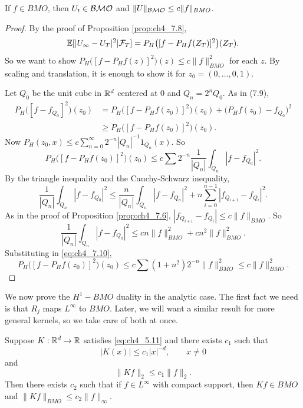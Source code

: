\begin{proposition}\label{prop:ch4_7.9}
If $f \in BMO$, then $U_t \in \mathcal{BMO}$ and $\|U\|_{\mathcal{BMO}} \leq c\|f\|_{BMO}$.
\end{proposition}

\begin{proof}
By the proof of Proposition \ref{prop:ch4_7.8},
\[
    \mathbb{E}[|U_\infty - U_T|^2| \mathcal{F}_T] = P_H\big([f - P_Hf(Z_T)]^2\big)(Z_T).
\]
So we want to show $P_H\big([f - P_Hf(z)]^2\big)(z) \leq c\|f\|^2_{BMO}$ for each $z$. By scaling and translation, it is enough to show it for $z_0 = (0,\ldots,0,1)$.

Let $Q_0$ be the unit cube in $\mathbb{R}^d$ centered at $0$ and $Q_n = 2^nQ_0$. As in (7.9),
\begin{align*}
    P_H\big([f - f_{Q_0}]^2\big)(z_0) &= P_H\big([f - P_Hf(z_0)]^2\big)(z_0) + \big(P_Hf(z_0) - f_{Q_0}\big)^2 \\
    &\geq P_H\big([f - P_Hf(z_0)]^2\big)(z_0).
\end{align*}
Now $P_H(z_0,x) \leq c\sum_{n=0}^\infty 2^{-n}|Q_n|^{-1}1_{Q_n}(x)$. So
\mpagebreak
\begin{equation}\label{eq:ch4_7.10}
    P_H\big([f - P_Hf(z_0)]^2\big)(z_0) \leq c\sum 2^{-n}\frac{1}{|Q_n|}\int_{Q_n} |f - f_{Q_0}|^2.
\end{equation}
By the triangle inequality and the Cauchy-Schwarz inequality,
\[
    \frac{1}{|Q_n|}\int_{Q_n} |f - f_{Q_0}|^2 \leq \frac{n}{|Q_n|}\int_{Q_n} |f - f_{Q_n}|^2 + n\sum_{i=0}^{n-1}|f_{Q_{i+1}} - f_{Q_i}|^2.
\]
As in the proof of Proposition \ref{prop:ch4_7.6}, $|f_{Q_{i+1}} - f_{Q_i}| \leq c\|f\|_{BMO}$. So
\[
    \frac{1}{|Q_n|}\int_{Q_n} |f - f_{Q_0}|^2 \leq cn\|f\|^2_{BMO} + cn^2\|f\|^2_{BMO}.
\]
Substituting in \eqref{eq:ch4_7.10},
\[
    P_H\big([f - P_Hf(z_0)]^2\big)(z_0) \leq c\sum(1 + n^2)2^{-n}\|f\|^2_{BMO} \leq c\|f\|^2_{BMO}.
\]
\end{proof}


We now prove the $H^1 - BMO$ duality in the analytic case. The first fact we need is that $R_j$ maps $L^\infty$ to $BMO$. Later, we will want a similar result for more general kernels, so we take care of both at once.

\begin{proposition}\label{prop:ch4_7.10}
Suppose $K : \mathbb{R}^d \to \mathbb{R}$ satisfies \eqref{eq:ch4_5.11} and there exists $c_1$ such that
\begin{equation}\label{eq:ch4_7.11}
    |K(x)| \leq c_1|x|^{-d}, \qquad x \neq 0
\end{equation}
and
\begin{equation}\label{eq:ch4_7.12}
    \|Kf\|_2 \leq c_1\|f\|_2.
\end{equation}
Then there exists $c_2$ such that if $f \in L^\infty$ with compact support, then $Kf \in BMO$ and $\|Kf\|_{BMO} \leq c_2\|f\|_\infty$.
\end{proposition}

